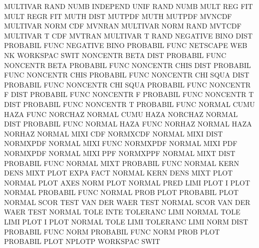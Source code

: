 MULTIVAR RAND NUMB                      INDEPEND UNIF RAND NUMB
MULT     REG                            FIT
MULT     REGR                           FIT
MUTH     DIST                           MUTPDF
MUTH                                    MUTPDF
MVNCDF                                  MULTIVAR NORM CDF
MVNRAN                                  MULTIVAR NORM RAND
MVTCDF                                  MULTIVAR T    CDF
MVTRAN                                  MULTIVAR T    RAND
NEGATIVE BINO DIST                      PROBABIL FUNC
NEGATIVE BINO                           PROBABIL FUNC
NETSCAPE                                WEB
NK                                      WORKSPAC SWIT
NONCENTR BETA DIST                      PROBABIL FUNC
NONCENTR BETA                           PROBABIL FUNC
NONCENTR CHIS DIST                      PROBABIL FUNC
NONCENTR CHIS                           PROBABIL FUNC
NONCENTR CHI  SQUA DIST                 PROBABIL FUNC
NONCENTR CHI  SQUA                      PROBABIL FUNC
NONCENTR F    DIST                      PROBABIL FUNC
NONCENTR F                              PROBABIL FUNC
NONCENTR T    DIST                      PROBABIL FUNC
NONCENTR T                              PROBABIL FUNC
NORMAL   CUMU HAZA FUNC                 NORCHAZ
NORMAL   CUMU HAZA                      NORCHAZ
NORMAL   DIST                           PROBABIL FUNC
NORMAL   HAZA FUNC                      NORHAZ
NORMAL   HAZA                           NORHAZ
NORMAL   MIXI CDF                       NORMXCDF
NORMAL   MIXI DIST                      NORMXPDF
NORMAL   MIXI FUNC                      NORMXPDF
NORMAL   MIXI PDF                       NORMXPDF
NORMAL   MIXI PPF                       NORMXPPF
NORMAL   MIXT DIST                      PROBABIL FUNC
NORMAL   MIXT                           PROBABIL FUNC
NORMAL   KERN DENS MIXT PLOT EXPA FACT  NORMAL   KERN DENS MIXT PLOT
NORMAL   PLOT AXES                      NORM     PLOT
NORMAL   PRED LIMI PLOT                 I        PLOT
NORMAL                                  PROBABIL FUNC
NORMAL   PROB PLOT                      PROBABIL PLOT
NORMAL   SCOR TEST                      VAN      DER  WAER TEST
NORMAL   SCOR                           VAN      DER  WAER TEST
NORMAL   TOLE INTE                      TOLERANC LIMI
NORMAL   TOLE LIMI PLOT                 I        PLOT
NORMAL   TOLE LIMI                      TOLERANC LIMI
NORM     DIST                           PROBABIL FUNC
NORM                                    PROBABIL FUNC
NORM     PROB PLOT                      PROBABIL PLOT
NPLOTP                                  WORKSPAC SWIT
